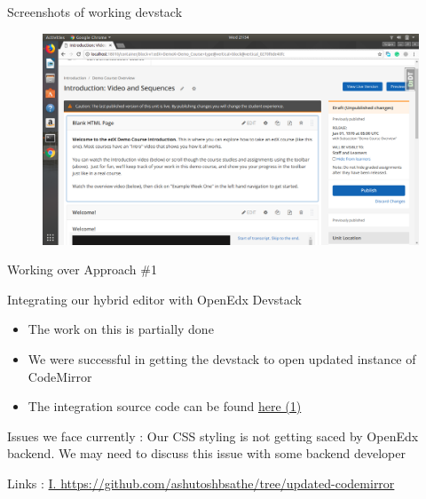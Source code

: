 \documentclass{beamer}
\begin{document}
	\begin{frame}{Screenshots of working devstack}
		\begin{figure}
			\includegraphics[width=\linewidth,height=\textheight,keepaspectratio]{./18-06-18/devstack-4.png}
		\end{figure}
	\end{frame}
	
	\begin{frame}{Working over Approach \#1}
		\begin{block}{Integrating our hybrid editor with OpenEdx Devstack}
			\begin{itemize}
				\item The work on this is partially done
				\item We were successful in getting the devstack to open updated instance of CodeMirror
				\item The integration source code can be found \alert{\href{https://github.com/ashutoshbsathe/tree/updated-codemirror}{here (1)}}
			\end{itemize}
		\end{block}
		\begin{block}{Issues we face currently :}
			Our CSS styling is not getting saced by OpenEdx backend. We may need to discuss this issue with some backend developer
		\end{block}
		\begin{block}{Links :}
		\tiny{\href{https://github.com/ashutoshbsathe/tree/updated-codemirror}{I. https://github.com/ashutoshbsathe/tree/updated-codemirror}}
		\end{block}
	\end{frame}
	
\end{document}
